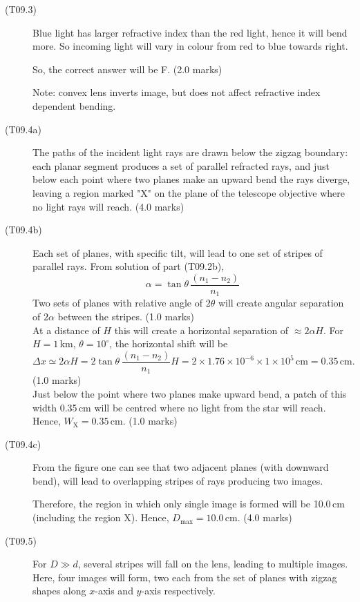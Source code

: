 \begin{description}
\item[(T09.3)]
Blue light has larger refractive index than the red light, hence it will
bend more. So incoming light will vary in colour from red to blue towards
right.

So, the correct answer will be F. \hfill(2.0 marks)

Note: convex lens inverts image, but does not affect refractive index
dependent bending.

\item[(T09.4a)]
The paths of the incident light rays are drawn below the zigzag boundary:
each planar segment produces a set of parallel refracted rays, and just
below each point where two planes make an upward bend the rays diverge,
leaving a region marked "X" on the plane of the telescope objective where no
light rays will reach. \hfill(4.0 marks)

\item[(T09.4b)]
Each set of planes, with specific tilt, will lead to one set of stripes of
parallel rays. From solution of part (T09.2b),
\[ \alpha = \tan\theta\,\frac{(n_1 - n_2)}{n_1} \]
Two sets of planes with relative angle of $2\theta$ will create angular
separation of $2\alpha$ between the stripes. \hfill(1.0 marks)\\
At a distance of $H$ this will create a horizontal separation of
$\approx 2\alpha H$. For $H = 1$\,km, $\theta = 10^\circ$, the horizontal
shift will be
\[ \Delta x \simeq 2\alpha H = 2\tan\theta\,\frac{(n_1 - n_2)}{n_1}H
   = 2 \times 1.76 \times 10^{-6} \times 1 \times 10^{5}\,\mathrm{cm}
   = 0.35\,\mathrm{cm}. \]
\hfill(1.0 marks)\\
Just below the point where two planes make upward bend, a patch of this
width 0.35\,cm will be centred where no light from the star will reach.
Hence, $W_{\mathrm{X}} = 0.35$\,cm. \hfill(1.0 marks)

\item[(T09.4c)]
From the figure one can see that two adjacent planes (with downward bend),
will lead to overlapping stripes of rays producing two images.

Therefore, the region in which only single image is formed will be 10.0\,cm
(including the region X). Hence, $D_{\mathrm{max}} = 10.0$\,cm.
\hfill(4.0 marks)

\item[(T09.5)]
For $D \gg d$, several stripes will fall on the lens, leading to multiple
images. Here, four images will form, two each from the set of planes with
zigzag shapes along $x$-axis and $y$-axis respectively.


\end{description}
